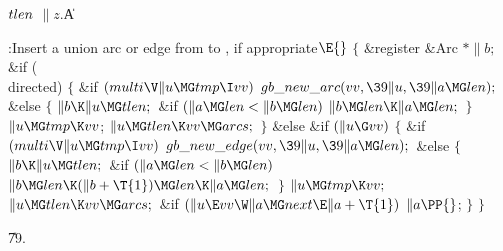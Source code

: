 \Y\B\4\D$\\{tlen}$ \5
$\|z.{}$\|A\par
\Y\B\4:Insert a union arc or edge from  to , if
appropriate\X${}\E{}$\6
${}\{{}$\5
\1\&{register} \&{Arc} ${}{*}\|b;{}$\7
\&{if} (\\{directed})\5
${}\{{}$\1\6
\&{if} ${}(\\{multi}\V\|u\MG\\{tmp}\I\\{vv}){}$\1\5
${}\\{gb\_new\_arc}(\\{vv},\39\|u,\39\|a\MG\\{len});{}$\2\6
\&{else}\5
${}\{{}$\1\6
${}\|b\K\|u\MG\\{tlen};{}$\6
\&{if} ${}(\|a\MG\\{len}<\|b\MG\\{len}){}$\1\5
${}\|b\MG\\{len}\K\|a\MG\\{len};{}$\2\6
\4${}\}{}$\2\6
${}\|u\MG\\{tmp}\K\\{vv}{}$;\6
${}\|u\MG\\{tlen}\K\\{vv}\MG\\{arcs};{}$\6
\4${}\}{}$\5
\2\&{else} \&{if} ${}(\|u\G\\{vv}){}$\5
${}\{{}$\1\6
\&{if} ${}(\\{multi}\V\|u\MG\\{tmp}\I\\{vv}){}$\1\5
${}\\{gb\_new\_edge}(\\{vv},\39\|u,\39\|a\MG\\{len});{}$\2\6
\&{else}\5
${}\{{}$\1\6
${}\|b\K\|u\MG\\{tlen};{}$\6
\&{if} ${}(\|a\MG\\{len}<\|b\MG\\{len}){}$\1\5
${}\|b\MG\\{len}\K(\|b+\T{1})\MG\\{len}\K\|a\MG\\{len};{}$\2\6
\4${}\}{}$\2\6
${}\|u\MG\\{tmp}\K\\{vv};{}$\6
${}\|u\MG\\{tlen}\K\\{vv}\MG\\{arcs};{}$\6
\&{if} ${}(\|u\E\\{vv}\W\|a\MG\\{next}\E\|a+\T{1}){}$\1\5
${}\|a\PP{}$;\2\6
\4${}\}{}$\2\6
\4${}\}{}$\2\par
\U79.\fi

